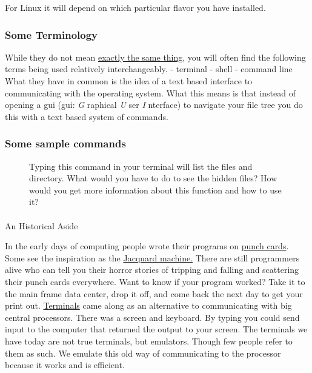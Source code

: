 \documentclass[
  letterpaper,
  DIV=11,
  numbers=noendperiod]{scrreprt}
\makeatletter
\let\oldparagraph\paragraph
\renewcommand{\paragraph}{
    \@ifstar
      \xxxParagraphStar
      \xxxParagraphNoStar
  }
\newcommand{\xxxParagraphStar}[1]{\oldparagraph*{#1}\mbox{}}
\newcommand{\xxxParagraphNoStar}[1]{\oldparagraph{#1}\mbox{}}
\newenvironment{Shaded}{\begin{snugshade}}{\end{snugshade}}
\newcommand{\FunctionTok}[1]{\textcolor[rgb]{0.28,0.35,0.67}{#1}}
\makeatother
\begin{document}
For Linux it will depend on which particular flavor you have installed.

\subsubsection{Some Terminology}\label{some-terminology}

While they do not mean
\href{https://www.geeksforgeeks.org/difference-between-terminal-console-shell-and-command-line/}{exactly
the same thing}, you will often find the following terms being used
relatively interchangeably. - terminal - shell - command line What they
have in common is the idea of a text based interface to communicating
with the operating system. What this means is that instead of opening a
gui (gui: \emph{G} raphical \emph{U} ser \emph{I} nterface) to navigate
your file tree you do this with a text based system of commands.

\subsubsection{Some sample commands}\label{some-sample-commands}

\begin{figure}

\centering{

\begin{Shaded}
\begin{Highlighting}[]
\FunctionTok{ls}
\end{Highlighting}
\end{Shaded}

}

\caption{\label{fig-ls}Typing this command in your terminal will list
the files and directory. What would you have to do to see the hidden
files? How would you get more information about this function and how to
use it?}

\end{figure}%

\paragraph{An Historical Aside}\label{an-historical-aside}

In the early days of computing people wrote their programs on
\href{https://en.wikipedia.org/wiki/Computer_programming_in_the_punched_card_era}{punch
cards}. Some see the inspiration as the
\href{https://en.wikipedia.org/wiki/Jacquard_machin}{Jacquard machine.}
There are still programmers alive who can tell you their horror stories
of tripping and falling and scattering their punch cards everywhere.
Want to know if your program worked? Take it to the main frame data
center, drop it off, and come back the next day to get your print out.
\href{https://en.wikipedia.org/wiki/Computer_terminal}{Terminals} came
along as an alternative to communicating with big central processors.
There was a screen and keyboard. By typing you could send input to the
computer that returned the output to your screen. The terminals we have
today are not true terminals, but emulators. Though few people refer to
them as such. We emulate this old way of communicating to the processor
because it works and is efficient.
\end{document}
